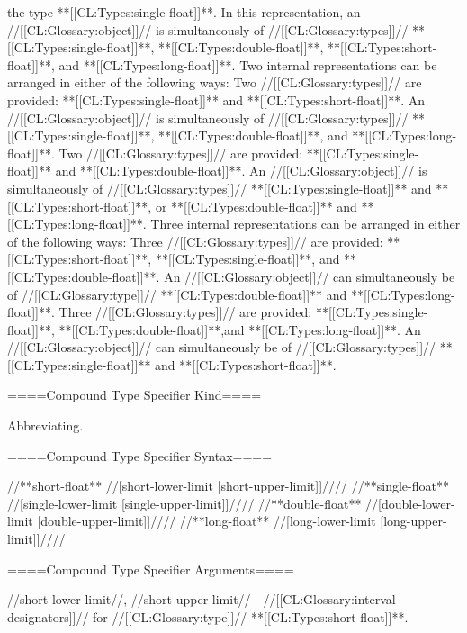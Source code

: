 the type **[[CL:Types:single-float]]**. In this representation, an //[[CL:Glossary:object]]// is simultaneously of //[[CL:Glossary:types]]// **[[CL:Types:single-float]]**, **[[CL:Types:double-float]]**, **[[CL:Types:short-float]]**, and **[[CL:Types:long-float]]**. \itemitem{--} Two internal representations can be arranged in either of the following ways: \beginlist \itemitem{\bull} Two //[[CL:Glossary:types]]// are provided: **[[CL:Types:single-float]]** and **[[CL:Types:short-float]]**. An //[[CL:Glossary:object]]// is simultaneously of //[[CL:Glossary:types]]// **[[CL:Types:single-float]]**, **[[CL:Types:double-float]]**, and **[[CL:Types:long-float]]**. \itemitem{\bull} Two //[[CL:Glossary:types]]// are provided: **[[CL:Types:single-float]]** and **[[CL:Types:double-float]]**. An //[[CL:Glossary:object]]// is simultaneously of //[[CL:Glossary:types]]// **[[CL:Types:single-float]]** and **[[CL:Types:short-float]]**, or **[[CL:Types:double-float]]** and **[[CL:Types:long-float]]**. \endlist \itemitem{--} Three internal representations can be arranged in either of the following ways: \beginlist \itemitem{\bull} Three //[[CL:Glossary:types]]// are provided: **[[CL:Types:short-float]]**, **[[CL:Types:single-float]]**, and **[[CL:Types:double-float]]**. An //[[CL:Glossary:object]]// can simultaneously be of //[[CL:Glossary:type]]// **[[CL:Types:double-float]]** and **[[CL:Types:long-float]]**. \itemitem{\bull} Three //[[CL:Glossary:types]]// are provided: **[[CL:Types:single-float]]**, **[[CL:Types:double-float]]**,and **[[CL:Types:long-float]]**. An //[[CL:Glossary:object]]// can simultaneously be of //[[CL:Glossary:types]]// **[[CL:Types:single-float]]** and **[[CL:Types:short-float]]**. \endlist \endlist

====Compound Type Specifier Kind====

Abbreviating.

====Compound Type Specifier Syntax====

//**short-float** //[short-lower-limit [short-upper-limit]]//// //**single-float** //[single-lower-limit [single-upper-limit]]//// //**double-float** //[double-lower-limit [double-upper-limit]]//// //**long-float** //[long-lower-limit [long-upper-limit]]////

====Compound Type Specifier Arguments====

//short-lower-limit//, //short-upper-limit// - //[[CL:Glossary:interval designators]]// for //[[CL:Glossary:type]]// **[[CL:Types:short-float]]**. 

